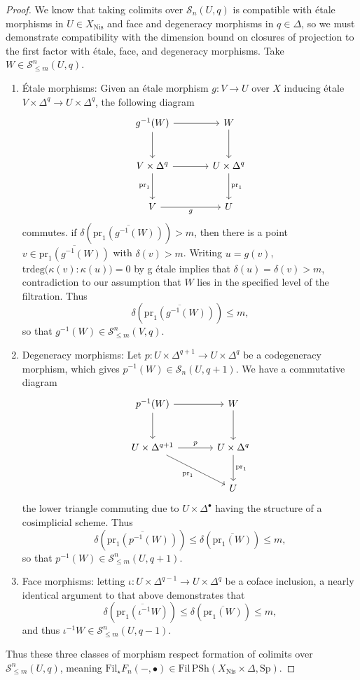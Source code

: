 \documentclass[11pt, twoside]{article}
\numberwithin{equation}{section}
\theoremstyle{definition}
\newcommand{\trd}{\mathrm{trdeg}}
\newcommand{\pr}{\mathrm{pr}}
\newcommand{\fil}{\mathrm{Fil}}
\newcommand{\Sp}{\mathrm{Sp}}
\newcommand{\psh}{\mathrm{PSh}}
\newcommand{\nis}{\mathrm{Nis}}
\begin{document}
\begin{proof}
We know that taking colimits over \(\mathcal{S}_n(U, q)\) is compatible with étale morphisms in \(U \in X_\nis\) and face and degeneracy morphisms in \(q \in \Delta\), so we must demonstrate compatibility with the dimension bound on closures of projection to the first factor with étale, face, and degeneracy morphisms. Take \(W \in \mathcal{S}_{\leq m}^n(U, q)\).

\begin{enumerate}

\item Étale morphisms: Given an étale morphism \(g \colon V \to U\) over \(X\) inducing étale \(V \times \Delta^q \to U \times \Delta^q\), the following diagram
\[\begin{tikzcd} [row sep = large, column sep = large] g^{- 1}(W) \ar[d] \ar[r] & W \ar[d]\\
V \times \Delta^q \ar[d, "\pr_1", swap] \ar[r, ""] & U \times \Delta^q \ar[d, "\pr_1"]\\
V \ar[r, "g", swap] & U \end{tikzcd}\]
commutes. if \(\delta(\overline{\pr_1(g^{- 1}(W))}) > m\), then there is a point \(v \in \overline{\pr_1(g^{- 1}(W))}\) with \(\delta(v) > m\). Writing \(u = g(v)\), \(\trd \big(\kappa(v) : \kappa(u)\big) = 0\) by g étale implies that \(\delta(u) = \delta(v) > m\), contradiction to our assumption that \(W\) lies in the specified level of the filtration. Thus 
\[\delta \! \left(\overline{\pr_1(g^{- 1}(W))}\right) \leq m,\]
so that \(g^{- 1}(W) \in \mathcal{S}_{\leq m}^n(V, q)\).

\item Degeneracy morphisms:
Let \(p \colon U \times \Delta^{q + 1} \to U \times \Delta^q\) be a codegeneracy morphism, which gives \(p^{- 1}(W) \in \mathcal{S}_n(U, q + 1)\). We have a commutative diagram 
\[\begin{tikzcd} [row sep = large, column sep = large] p^{- 1}(W) \ar[d] \ar[r] & W \ar[d]\\
U \times \Delta^{q + 1} \ar[dr, "\pr_1", swap] \ar[r, "p"] & U \times \Delta^q \ar[d, "\pr_1"]\\
& U \end{tikzcd}\]
the lower triangle commuting due to \(U \times \Delta^\bullet\) having the structure of a cosimplicial scheme. Thus 
\[\delta \! \left(\overline{\pr_1(p^{- 1}(W))}\right) \leq \delta \! \left(\overline{\pr_1(W)}\right) \leq m,\]
so that \(p^{- 1}(W) \in \mathcal{S}_{\leq m}^n(U, q + 1)\).

\item Face morphisms: letting \(\iota \colon U \times \Delta^{q - 1} \to U \times \Delta^q\) be a coface inclusion, a nearly identical argument to that above demonstrates that 
\[\delta \! \left(\overline{\pr_1(\iota^{- 1} W)}\right) \leq \delta \! \left(\overline{\pr_1(W)}\right) \leq m,\]
and thus \(\iota^{- 1} W \in \mathcal{S}_{\leq m}^n(U, q - 1)\).

\end{enumerate}
Thus these three classes of morphism respect formation of colimits over \(\mathcal{S}_{\leq m}^n(U, q)\), meaning \(\fil_\star F_n( -, \bullet) \in \fil \, \psh(X_\nis \times \Delta, \Sp)\).
\end{proof}
\end{document}
